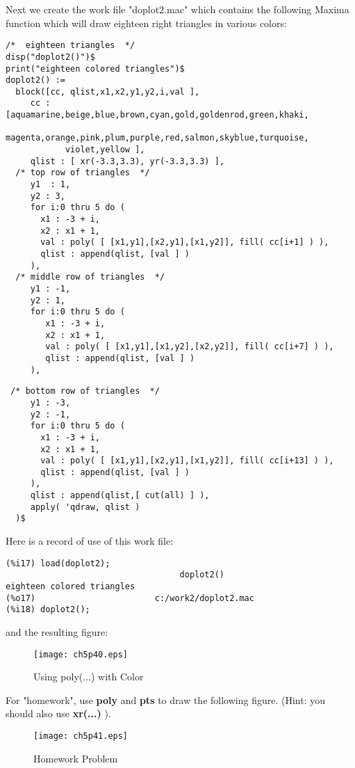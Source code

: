 \documentclass[12pt]{article}
\begin{document}
\smallskip
Next we create the work file "doplot2.mac" which contains the following Maxima function 
  which will draw eighteen right triangles in various colors:
\small
\begin{verbatim}
/*  eighteen triangles  */
disp("doplot2()")$
print("eighteen colored triangles")$
doplot2() := 
  block([cc, qlist,x1,x2,y1,y2,i,val ],
     cc : [aquamarine,beige,blue,brown,cyan,gold,goldenrod,green,khaki,
            magenta,orange,pink,plum,purple,red,salmon,skyblue,turquoise,
            violet,yellow ],            
     qlist : [ xr(-3.3,3.3), yr(-3.3,3.3) ],     
  /* top row of triangles  */
     y1  : 1,
     y2 : 3,
     for i:0 thru 5 do ( 
       x1 : -3 + i,
       x2 : x1 + 1,
       val : poly( [ [x1,y1],[x2,y1],[x1,y2]], fill( cc[i+1] ) ),
       qlist : append(qlist, [val ] ) 
     ),
  /* middle row of triangles  */
     y1 : -1,
     y2 : 1,
     for i:0 thru 5 do (
        x1 : -3 + i,
        x2 : x1 + 1,
        val : poly( [ [x1,y1],[x1,y2],[x2,y2]], fill( cc[i+7] ) ),
        qlist : append(qlist, [val ] ) 
     ),                
\end{verbatim}
\newpage
\begin{verbatim}
 /* bottom row of triangles  */
     y1 : -3,
     y2 : -1,
     for i:0 thru 5 do (
       x1 : -3 + i,
       x2 : x1 + 1,
       val : poly( [ [x1,y1],[x2,y1],[x1,y2]], fill( cc[i+13] ) ),
       qlist : append(qlist, [val ] )        
     ),          
     qlist : append(qlist,[ cut(all) ] ),                    
     apply( 'qdraw, qlist )                                   
  )$     
\end{verbatim}
\normalsize
Here is a record of use of this work file:
\small
\begin{verbatim}
(%i17) load(doplot2);
                                   doplot2()
eighteen colored triangles 
(%o17)                        c:/work2/doplot2.mac
(%i18) doplot2();
\end{verbatim}
\normalsize
and the resulting figure:
\begin{figure} [h]
   \centerline{\texttt{[image: ch5p40.eps]} }
	\caption{Using poly(...) with Color}
\end{figure}      

\smallskip
For "homework", use \textbf{poly} and \textbf{pts} to draw the following figure.
(Hint: you should also use \textbf{xr(...)} ).
\begin{figure} [h]
   \centerline{\texttt{[image: ch5p41.eps]} }
	\caption{Homework Problem}
\end{figure}      
%
\newpage
\end{document}
